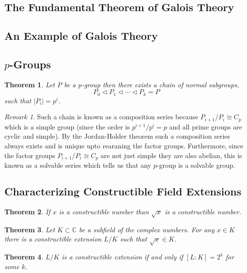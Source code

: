 \documentclass[11pt,a4paper]{article}
\newcommand{\C}{\mathbb{C}}
\theoremstyle{theorem}
\newtheorem{theorem}{Theorem}[section]
\theoremstyle{definition}
\theoremstyle{definition}
\theoremstyle{remark}
\theoremstyle{definition}
\theoremstyle{remark}
\newtheorem{remark}{Remark}[subsection]
\begin{document}
\subsection{The Fundamental Theorem of Galois Theory}

\subsection{An Example of Galois Theory}

\subsection{$p$-Groups}

\begin{theorem}
Let $P$ be a $p$-group then there exists a chain of normal subgroups,
\[P_0 \triangleleft P_1 \triangleleft \cdots \triangleleft P_k = P\]
such that $|P_i| = p^i$. 
\end{theorem}

\begin{remark}
Such a chain is known as a composition series because $P_{i + 1}/P_i \cong C_p$ which is a simple group (since the order is $p^{i+1}/p^i = p$ and all prime groups are cyclic and simple). By the Jordan-Holder theorem such a composition series always exists and is unique upto rearaning the factor groups. Furthermore, since the factor groups $P_{i + 1}/P_i \cong C_p$ are not just simple they are also abelian, this is known as a solvable series which tells us that any $p$-group is a solvable group.  
\end{remark}

\subsection{Characterizing Constructible Field Extensions}

\begin{theorem}
If $x$ is a constructible number than $\sqrt{x}$ is a constructible number.
\end{theorem}

\begin{theorem}
Let $K \subset \C$ be a subfield of the complex numbers. For any $x \in K$ there is a constructible extension $L/K$ such that $\sqrt{x} \in K$.  
\end{theorem}

\begin{theorem}
$L/K$ is a constructible extension if and only if $[L : K] = 2^k$ for some $k$. 
\end{theorem}
\end{document}
